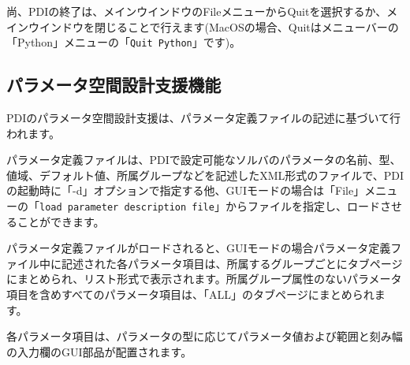 \documentclass[a4paper,11pt]{jarticle}
\begin{document}
尚、PDIの終了は、メインウインドウのFileメニューからQuitを選択するか、メインウインドウを閉じることで行えます(MacOSの場合、Quitはメニューバーの「Python」メニューの「{\tt Quit Python}」です)。


\subsection{パラメータ空間設計支援機能}

PDIのパラメータ空間設計支援は、パラメータ定義ファイルの記述に基づいて行われます。

パラメータ定義ファイルは、PDIで設定可能なソルバのパラメータの名前、型、値域、デフォルト値、所属グループなどを記述したXML形式のファイルで、PDIの起動時に「-d」オプションで指定する他、GUIモードの場合は「File」メニューの「{\tt load parameter description file}」からファイルを指定し、ロードさせることができます。


パラメータ定義ファイルがロードされると、GUIモードの場合パラメータ定義ファイル中に記述された各パラメータ項目は、所属するグループごとにタブページにまとめられ、リスト形式で表示されます。所属グループ属性のないパラメータ項目を含めすべてのパラメータ項目は、「ALL」のタブページにまとめられます。


各パラメータ項目は、パラメータの型に応じてパラメータ値および範囲と刻み幅の入力欄のGUI部品が配置されます。
\end{document}
